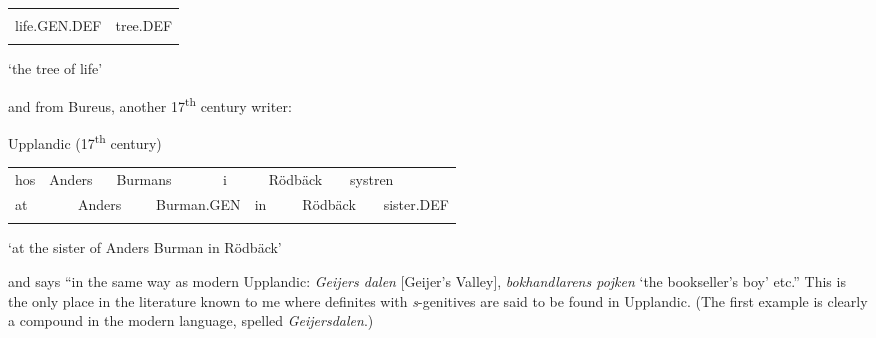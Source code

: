 \begin{tabular}{ll}
\lsptoprule
\multicolumn{2}{l}{Lijffzens

}\\
life.GEN.DEF & tree.DEF\\
\lspbottomrule
\end{tabular}

\begin{styleTranslation}
 ‘the tree of life’

\end{styleTranslation}

and from Bureus, another 17\textsuperscript{th} century writer:

\begin{listWWNumileveli}
\item 

\begin{styleExample}
Upplandic (17\textsuperscript{th} century)

\end{styleExample}

\end{listWWNumileveli}

\begin{tabular}{llllllllllll}
\lsptoprule
hos & \multicolumn{2}{l}{Anders

} & \multicolumn{2}{l}{Burmans

} & \multicolumn{2}{l}{i

} & \multicolumn{2}{l}{Rödbäck

} & \multicolumn{2}{l}{systren

} & \\
\multicolumn{2}{l}{at

} & \multicolumn{2}{l}{Anders

} & \multicolumn{2}{l}{Burman.GEN

} & \multicolumn{2}{l}{in

} & \multicolumn{2}{l}{Rödbäck

} & \multicolumn{2}{l}{sister.DEF

}\\
\lspbottomrule
\end{tabular}

\begin{styleTranslation}
‘at the sister of Anders Burman in Rödbäck’

\end{styleTranslation}

\begin{styleBodyTextFirst}
and says “in the same way as modern Upplandic: \textit{Geijers dalen }[Geijer’s Valley], \textit{bokhandlarens pojken} ‘the bookseller’s boy’ etc.” This is the only place in the literature known to me where definites with \textit{s}{}-genitives are said to be found in Upplandic. (The first example is clearly a compound in the modern language, spelled \textit{Geijersdalen}.)

\end{styleBodyTextFirst}

